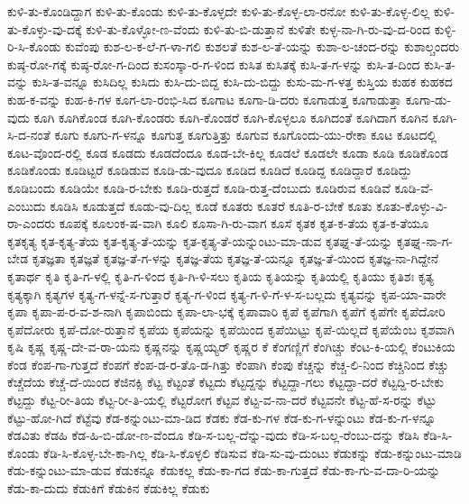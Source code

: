 {ಕುಳಿ-ತು-ಕೊಂಡಿದ್ದಾಗ
ಕುಳಿ-ತು-ಕೊಂಡು
ಕುಳಿ-ತು-ಕೊಳ್ಳದೇ
ಕುಳಿ-ತು-ಕೊಳ್ಳ-ಲಾ-ರನೋ
ಕುಳಿ-ತು-ಕೊಳ್ಳ-ಲಿಲ್ಲ
ಕುಳಿ-ತು-ಕೊಳ್ಳು-ವು-ದಕ್ಕೆ
ಕುಳಿ-ತು-ಕೊಳ್ಳೋ-ಣ-ವೆಂದು
ಕುಳಿ-ತು-ಬಿ-ಡುತ್ತಾನೆ
ಕುಳಿತೇ
ಕುಳ್ಳ-ನಾ-ಗಿ-ರು-ವು-ದ-ರಿಂದ
ಕುಳ್ಳಿ-ರಿ-ಸಿ-ಕೊಂಡು
ಕುವೆಂಪು
ಕುಶ-ಲ-ಕ-ಲೆ-ಗ-ಳಾ-ಗಲಿ
ಕುಶಲತೆ
ಕುಶ-ಲ-ತೆ-ಯನ್ನು
ಕುಶಾ-ಲ-ಚಂದ-ರನ್ನು
ಕುಶಾಲ್ಚಂದರು
ಕುಷ್ಠ-ರೋ-ಗಕ್ಕೆ
ಕುಷ್ಠ-ರೋ-ಗ-ದಿಂದ
ಕುಸಂಸ್ಕಾ-ರ-ಗ-ಳಿಂದ
ಕುಸಿತ
ಕುಸಿತಕ್ಕೆ
ಕುಸಿ-ತ-ಗ-ಳನ್ನು
ಕುಸಿ-ತ-ದಿಂದ
ಕುಸಿ-ತ-ವನ್ನು
ಕುಸಿ-ತ-ವನ್ನೂ
ಕುಸಿದಿಲ್ಲ
ಕುಸಿದು
ಕುಸಿ-ದು-ಬಿದ್ದ
ಕುಸಿ-ದು-ಬಿದ್ದು
ಕುಸು-ಮ-ಗ-ಳತ್ತ
ಕುಸ್ತಿಯ
ಕುಹಕ
ಕುಹಕದ
ಕುಹ-ಕ-ವನ್ನು
ಕುಹ-ಕಿ-ಗಳ
ಕೂಗ-ಲಾ-ರಂಭಿ-ಸಿದ
ಕೂಗಾಟ
ಕೂಗಾ-ಡಿ-ದರು
ಕೂಗಾಡುತ್ತ
ಕೂಗಾಡುತ್ತಾ
ಕೂಗಾ-ಡು-ವುದು
ಕೂಗಿ
ಕೂಗಿಕೊಂಡ
ಕೂಗಿ-ಕೊಂಡರು
ಕೂಗಿ-ಕೊಂಡರೆ
ಕೂಗಿ-ಕೊಳ್ಳಲೂ
ಕೂಗಿದಂತೆ
ಕೂಗಿದಾಗ
ಕೂಗಿನ
ಕೂಗಿ-ಸಿ-ದ-ನಂತೆ
ಕೂಗು
ಕೂಗು-ಗ-ಳನ್ನೂ
ಕೂಗುತ್ತ
ಕೂಗುತ್ತಿತ್ತು
ಕೂಗುವ
ಕೂಗೊಂದು-ಯು-ರೇಕಾ
ಕೂಟ
ಕೂಟದಲ್ಲಿ
ಕೂಟ-ವೊಂದ-ರಲ್ಲಿ
ಕೂಡ
ಕೂಡದು
ಕೂಡದೆಂದೂ
ಕೂಡ-ಬೇ-ಕಿಲ್ಲ
ಕೂಡಲೆ
ಕೂಡಲೇ
ಕೂಡಾ
ಕೂಡಿ
ಕೂಡಿಕೊಂಡ
ಕೂಡಿಕೊಂಡು
ಕೂಡಿಟ್ಟರೆ
ಕೂಡಿಡುವ
ಕೂಡಿ-ಡು-ವುದೂ
ಕೂಡಿದ
ಕೂಡಿದೆ
ಕೂಡಿದ್ದ
ಕೂಡಿದ್ದಾರೆ
ಕೂಡಿದ್ದು
ಕೂಡಿಬಂದು
ಕೂಡಿಯೇ
ಕೂಡಿ-ರ-ಬೇಕು
ಕೂಡಿ-ರುತ್ತದೆ
ಕೂಡಿ-ರುತ್ತ-ದೆಂಬುದು
ಕೂಡಿರುವ
ಕೂಡಿವೆ
ಕೂಡಿ-ವೆ-ಎಂಬುದು
ಕೂಡಿಸಿ
ಕೂಡುತ್ತದೆ
ಕೂಡು-ವು-ದಿಲ್ಲ
ಕೂಡೆ
ಕೂತರು
ಕೂತರೆ
ಕೂತಿ-ರ-ಬೇಕೆ
ಕೂತು
ಕೂತು-ಕೊಳ್ಳು-ವಿ-ರಾ-ಎಂದರು
ಕೂಪಕ್ಕೆ
ಕೂಲಂಕ-ಷ-ವಾಗಿ
ಕೂಲಿ
ಕೂಸಾ-ಗಿ-ರು-ವಾಗ
ಕೂಸೆ
ಕೃತಕ
ಕೃತ-ಕ-ತೆಯ
ಕೃತ-ಕ-ತೆಯೂ
ಕೃತಕೃತ್ಯ
ಕೃತ-ಕೃತ್ಯ-ತೆಯ
ಕೃತ-ಕೃತ್ಯ-ತೆ-ಯನ್ನು
ಕೃತ-ಕೃತ್ಯ-ತೆ-ಯನ್ನುಂಟು-ಮಾ-ಡುವ
ಕೃತಘ್ನ-ತೆ-ಯನ್ನು
ಕೃತಘ್ನ-ನಾ-ಗ-ಬೇಡ
ಕೃತಜ್ಞತಾ
ಕೃತಜ್ಞತೆ
ಕೃತಜ್ಞ-ತೆ-ಗ-ಳನ್ನು
ಕೃತಜ್ಞ-ತೆಯ
ಕೃತಜ್ಞ-ತೆ-ಯನ್ನೂ
ಕೃತಜ್ಞ-ತೆ-ಯಿಂದ
ಕೃತಜ್ಞ-ನಾ-ಗಿದ್ದೇನೆ
ಕೃತಾರ್ಥ
ಕೃತಿ
ಕೃತಿ-ಗ-ಳಲ್ಲಿ
ಕೃತಿ-ಗ-ಳಿಂದ
ಕೃತಿ-ಗಿ-ಳಿ-ಸಲು
ಕೃತಿಯ
ಕೃತಿಯನ್ನು
ಕೃತಿಯಲ್ಲಿ
ಕೃತಿಯು
ಕೃತಿಶಃ
ಕೃತ್ಯ
ಕೃತ್ಯಕ್ಕಾಗಿ
ಕೃತ್ಯಗಳ
ಕೃತ್ಯ-ಗ-ಳನ್ನೆ-ಸ-ಗುತ್ತಾರೆ
ಕೃತ್ಯ-ಗ-ಳಿಂದ
ಕೃತ್ಯ-ಗ-ಳಿ-ಗೆ-ಳ-ಸ-ಬಲ್ಲದು
ಕೃತ್ಯವನ್ನು
ಕೃಪ-ಯಾ-ವಾರೇ
ಕೃಪಾ
ಕೃಪಾ-ಪ-ರ-ವ-ಶ-ನಾಗಿ
ಕೃಪಾಬಿಂದು
ಕೃಪಾ-ಲಾ-ಭಕ್ಕೆ
ಕೃಪಾವಾರಿ
ಕೃಪೆ
ಕೃಪೆಗಾಗಿ
ಕೃಪೆಗೆ
ಕೃಪೆಗೇ
ಕೃಪೆದೋರಿ
ಕೃಪೆದೋರು
ಕೃಪೆ-ದೋ-ರುತ್ತಾನೆ
ಕೃಪೆಯ
ಕೃಪೆಯನ್ನು
ಕೃಪೆಯಿಂದ
ಕೃಪೆಯಿಟ್ಟು
ಕೃಪೆ-ಯಿಲ್ಲದೆ
ಕೃಪೆಯೆಂಬ
ಕೃಶವಾಗಿ
ಕೃಷಿ
ಕೃಷ್ಣ
ಕೃಷ್ಣ-ದೇ-ವ-ರಾ-ಯನು
ಕೃಷ್ಣನನ್ನು
ಕೃಷ್ಣಯ್ಯರ್
ಕೃಷ್ಣರ
ಕೆ
ಕೆಂಗಣ್ಣಿಗೆ
ಕೆಂಗಿಚ್ಚು
ಕೆಂಟ-ಕಿ-ಯಲ್ಲಿ
ಕೆಂಟುಕಿಯ
ಕೆಂಡ
ಕೆಂಪ-ಗಾ-ಗುತ್ತದೆ
ಕೆಂಪಗೆ
ಕೆಂಪ-ಡ-ರ-ತೊ-ಡ-ಗಿತ್ತು
ಕೆಂಪಾಗಿ
ಕೆಂಪು
ಕೆಚ್ಚನ್ನು
ಕೆಚ್ಚ-ಲಿ-ನಿಂದ
ಕೆಚ್ಚಿನಿಂದ
ಕೆಚ್ಚು
ಕೆಚ್ಚೆದೆಯ
ಕೆಚ್ಚೆ-ದೆ-ಯಿಂದ
ಕೆಜಿನಕ್ಸಿ
ಕೆಟ್ಟ
ಕೆಟ್ಟಂತೆ
ಕೆಟ್ಟದು
ಕೆಟ್ಟದ್ದನ್ನು
ಕೆಟ್ಟದ್ದಾ-ಗಲು
ಕೆಟ್ಟದ್ದಾ-ದರೆ
ಕೆಟ್ಟದ್ದಿ-ರ-ಬೇಕು
ಕೆಟ್ಟದ್ದು
ಕೆಟ್ಟ-ರೀ-ತಿಯ
ಕೆಟ್ಟ-ರೀ-ತಿ-ಯಲ್ಲಿ
ಕೆಟ್ಟರೋಗ
ಕೆಟ್ಟವ
ಕೆಟ್ಟ-ವ-ನಾ-ದರೆ
ಕೆಟ್ಟವನೇ
ಕೆಟ್ಟ-ಹೆ-ಸ-ರನ್ನು
ಕೆಟ್ಟು
ಕೆಟ್ಟು-ಹೋ-ಗಿದೆ
ಕೆಟ್ಟೆವು
ಕೆಡ-ಕನ್ನುಂಟು-ಮಾ-ಡಿದ
ಕೆಡಕು
ಕೆಡ-ಕು-ಗಳ
ಕೆಡ-ಕು-ಗ-ಳನ್ನುಂಟು
ಕೆಡ-ಕು-ಗ-ಳನ್ನೂ
ಕೆಡವಿತು
ಕೆಡಹಿ
ಕೆಡ-ಹಿ-ಬಿ-ಡೋ-ಣ-ವೆಂದೂ
ಕೆಡಿ-ಸ-ಬಲ್ಲ-ದೆನ್ನು-ವುದು
ಕೆಡಿ-ಸ-ಬಲ್ಲ-ರೆಂಬು-ದನ್ನು
ಕೆಡಿಸಿ
ಕೆಡಿ-ಸಿ-ಕೊಂಡು
ಕೆಡಿ-ಸಿ-ಕೊಳ್ಳ-ಬೇ-ಕಾ-ಗಿಲ್ಲ
ಕೆಡಿ-ಸಿ-ಕೊಳ್ಳಲಿ
ಕೆಡಿಸುವ
ಕೆಡಿ-ಸು-ವು-ದುಂಟು
ಕೆಡುಕನ್ನು
ಕೆಡು-ಕನ್ನುಂಟು-ಮಾಡಿ
ಕೆಡು-ಕನ್ನುಂಟು-ಮಾ-ಡುವ
ಕೆಡುಕನ್ನೂ
ಕೆಡುಕಲ್ಲ
ಕೆಡು-ಕಾ-ಗದ
ಕೆಡು-ಕಾ-ಗುತ್ತದೆ
ಕೆಡು-ಕಾ-ಗು-ವ-ದಾ-ರಿ-ಯನ್ನು
ಕೆಡು-ಕಾ-ದುದು
ಕೆಡುಕಿಗೆ
ಕೆಡುಕಿನ
ಕೆಡುಕಿಲ್ಲ
ಕೆಡುಕು
}
